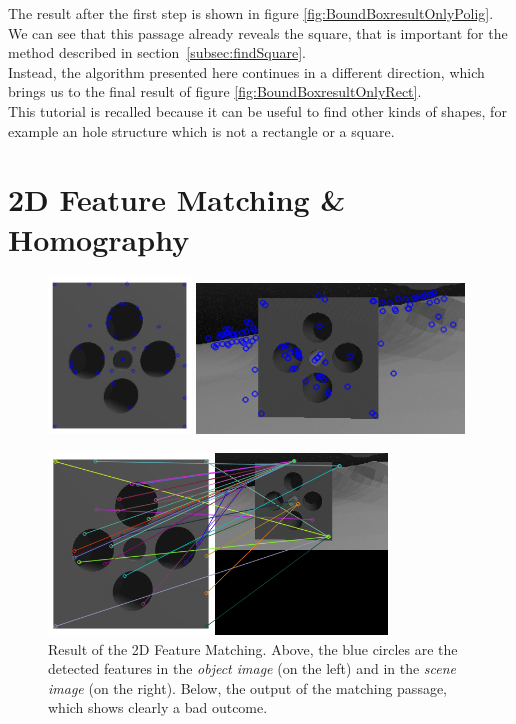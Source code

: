 The result after the first step is shown in figure \ref{fig:BoundBoxresultOnlyPolig}. We can see that this passage already reveals the square, that is important for the method described in \mbox{section \ref{subsec:findSquare}.}\\
Instead, the algorithm presented here continues in a different direction, which brings us to the final result of figure \ref{fig:BoundBoxresultOnlyRect}.\\

This tutorial is recalled because it can be useful to find other kinds of shapes, for example an hole structure which is not a rectangle or a square.


\section{2D Feature Matching \& Homography}
\begin{figure}[H]
	\centering
	\centerline{
		\includegraphics[width=3.8cm]{new_featHomog_SURF_templKeyPoint}
		\qquad
		\includegraphics[width=7.1cm]{new_featHomog_SURF_cameraKeyPoint}
	}
	\vspace{10px}
	\includegraphics[width=9cm]{new_featHomog_SURF_result}
	\caption[Result of 2D Feature Matching]{Result of the 2D Feature Matching. Above, the blue circles are the detected features in the \textit{object image} (on the left) and in the \textit{scene image} (on the right). Below, the output of the matching passage, which shows clearly a bad outcome.}
	\label{fig:featHomog}
\end{figure}

